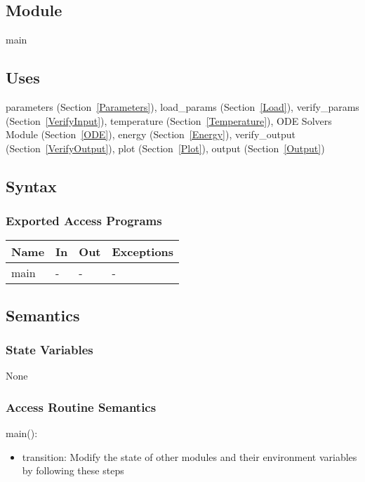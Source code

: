 \documentclass[12pt]{article}
\begin{document}
\subsection{Module}

main

\subsection{Uses}

parameters (Section~\ref{Parameters}), load\_params (Section~\ref{Load}), verify\_params
(Section~\ref{VerifyInput}), temperature (Section~\ref{Temperature}), ODE Solvers Module
(Section~\ref{ODE}), energy (Section~\ref{Energy}), verify\_output (Section~\ref{VerifyOutput}), plot
(Section~\ref{Plot}), output (Section~\ref{Output})

\subsection{Syntax}

\subsubsection{Exported Access Programs}

\begin{center}
\begin{tabular}{p{2cm} p{4cm} p{4cm} p{2cm}}
\hline
\textbf{Name} & \textbf{In} & \textbf{Out} & \textbf{Exceptions} \\
\hline
main & - & - & - \\
\hline
\end{tabular}
\end{center}

\subsection{Semantics}

\subsubsection{State Variables}

None

\subsubsection{Access Routine Semantics}

\noindent main():
\begin{itemize}
\item transition: Modify the state of other modules and their
  environment variables by following these steps\\
\end{itemize}
\end{document}
